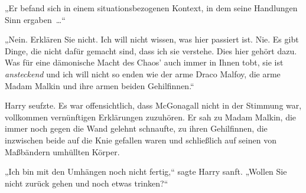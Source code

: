 „Er befand sich in einem situationsbezogenen Kontext, in dem seine Handlungen Sinn ergaben …“

„Nein. Erklären Sie nicht. Ich will nicht wissen, was hier passiert ist. Nie. Es gibt Dinge, die nicht dafür gemacht sind, dass ich sie verstehe. Dies hier gehört dazu. Was für eine dämonische Macht des Chaos' auch immer in Ihnen tobt, sie ist \emph{ansteckend} und ich will nicht so enden wie der arme Draco Malfoy, die arme Madam Malkin und ihre armen beiden Gehilfinnen.“

Harry seufzte. Es war offensichtlich, dass McGonagall nicht in der Stimmung war, vollkommen vernünftigen Erklärungen zuzuhören. Er sah zu Madam Malkin, die immer noch gegen die Wand gelehnt schnaufte, zu ihren Gehilfinnen, die inzwischen beide auf die Knie gefallen waren und schließlich auf seinen von Maßbändern umhüllten Körper.

„Ich bin mit den Umhängen noch nicht fertig,“ sagte Harry sanft. „Wollen Sie nicht zurück gehen und noch etwas trinken?“

